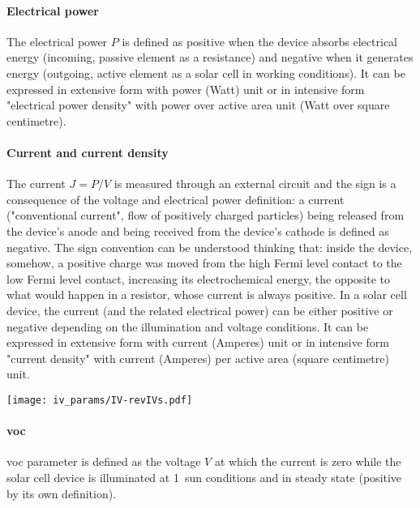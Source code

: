 		\paragraph{Electrical power}
		The electrical power $P$ is defined as positive when the device absorbs electrical energy (incoming, passive element as a resistance) and negative when it generates energy (outgoing, active element as a solar cell in working conditions).
		It can be expressed in extensive form with power (Watt) unit or in intensive form "electrical power density" with power over active area unit (Watt over square centimetre).

		\paragraph{Current and current density}
		The current $J=P/V$ is measured through an external circuit and the sign is a consequence of the voltage and electrical power definition: a current ("conventional current", flow of positively charged particles) being released from the device's anode and being received from the device's cathode is defined as negative.
		The sign convention can be understood thinking that: inside the device, somehow, a positive charge was moved from the high Fermi level contact to the low Fermi level contact, increasing its electrochemical energy, the opposite to what would happen in a resistor, whose current is always positive.
		In a solar cell device, the current (and the related electrical power) can be either positive or negative depending on the illumination and voltage conditions.
		It can be expressed in extensive form with current (Amperes) unit or in intensive form "current density" with current (Amperes) per active area (square centimetre) unit.

		\begin{SCfigure}
			\centering
			\texttt{[image: iv\_params/IV-revIVs.pdf]}
			\label{fig:iv_params}
		\end{SCfigure}

		\paragraph{\Glsdesc{voc}} \Gls{voc} parameter is defined as the voltage $V$ at which the current is zero while the solar cell device is illuminated at 1~sun conditions and in steady state (positive by its own definition).

